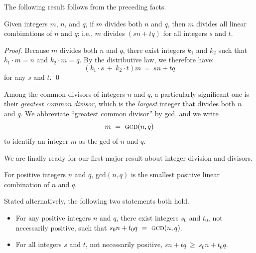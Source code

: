The following result follows from the preceding facts.

\begin{prop}
\label{thm:m-commondivisor-n-q}
Given integers $m$, $n$, and $q$, if $m$ divides both $n$ and $q$, then $m$ divides all linear combinations of $n$ and $q$; i.e., $m \mbox{ divides } (sn + tq)$ for all integers $s$ and $t$.
\end{prop}

\begin{proof}
Because $m$ divides both $n$ and $q$, 
there exist integers $k_1$ and $k_2$ such that $k_1 \cdot m = n$ and $k_2 \cdot m = q$.  By the distributive law, we therefore have:
\[ (k_1 \cdot s \ + \ k_2 \cdot t)m \ = \ sn+tq \]
for any $s$ and $t$.  \qed
\end{proof}

 
Among the common divisors of integers $n$ and $q$, a particularly significant one is their {\em greatest common divisor}, which is the {\em largest} integer that divides both $n$ and $q$.  We abbreviate ``greatest common divisor'' by {\sc gcd}, and we write
\[ m \ = \ \mbox{\sc gcd}(n, q) \]
to identify an integer $m$ as the {\sc gcd} of $n$ and $q$.

\smallskip

We are finally ready for our first major result about integer division and divisors.

\begin{prop}
\label{thm:gcd-n-linear}
For positive integers $n$ and $q$, {\sc gcd}$(n, q)$ is the smallest positive linear combination of $n$ and $q$.

\medskip

\noindent
Stated alternatively, the following two statements both hold.
\begin{itemize}
\item
For any positive integers $n$ and $q$, there exist integers $s_0$ and $t_0$, not necessarily positive, such that $s_0 n + t_0 q \ = \ \mbox{\sc gcd}(n, q)$.
\item
For all integers $s$ and $t$, not necessarily positive, $s n + t q \ \geq \ s_0 n + t_0 q$.
\end{itemize}
\end{prop}

